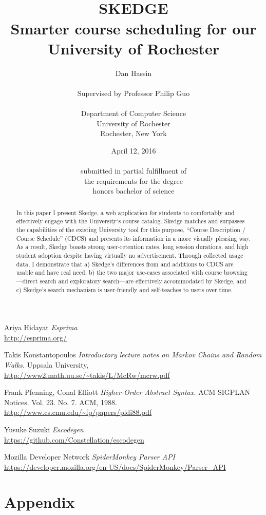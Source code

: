 \documentclass[titlepage]{report}
\title{
\vspace{80pt}\\
\LARGE \bfseries SKEDGE
\\\vspace{10pt}\Large Smarter course scheduling for our\\University of Rochester
}
\author{
	Dan Hassin\\
    \vspace{5pt}\\
    Supervised by Professor Philip Guo\\
    \vspace{5pt}\\
    Department of Computer Science\\
    University of Rochester\\
    Rochester, New York\\
}
\date{April 12, 2016\\
    \vspace{150pt}\\
    submitted in partial fulfillment of\\
    the requirements for the degree\\
    honors bachelor of science\\
}
\begin{document}
\maketitle

\doublespacing



\begin{abstract}

In this paper I present Skedge, a web application for students to comfortably and effectively engage with the University's course catalog. Skedge matches and surpasses the capabilities of the existing University tool for this purpose, ``Course Description / Course Schedule'' (CDCS) and presents its information in a more visually pleasing way. As a result, Skedge boasts strong user-retention rates, long session durations, and high student adoption despite having virtually no advertisement. Through collected usage data, I demonstrate that a) Skedge's differences from and additions to CDCS are usable and have real need, b) the two major use-cases associated with course browsing---direct search and exploratory search---are effectively accommodated by Skedge, and c) Skedge's search mechanism is user-friendly and self-teaches to users over time.

\end{abstract}

\tableofcontents


\clearpage


\clearpage


\clearpage


\clearpage

\begin{thebibliography}{1}

	 Ariya Hidayat {\em Esprima}
		\\\url{http://esprima.org/}

	 Takis Konstantopoulos {\em Introductory lecture notes on
		Markov Chains and Random Walks.} Uppsala University,
		\\\url{http://www2.math.uu.se/~takis/L/McRw/mcrw.pdf}

	 Frank Pfenning, Conal Elliott
		{\em Higher-Order Abstract Syntax.}
		ACM SIGPLAN Notices. Vol. 23. No. 7. ACM, 1988.
		\\\url{http://www.cs.cmu.edu/~fp/papers/pldi88.pdf}

	 Yusuke Suzuki {\em Escodegen}
		\\\url{https://github.com/Constellation/escodegen}

	 Mozilla Developer Network {\em SpiderMonkey Parser API}
		\\\url{https://developer.mozilla.org/en-US/docs/SpiderMonkey/Parser_API}

\end{thebibliography}


\clearpage
\section*{Appendix}
\end{document}
